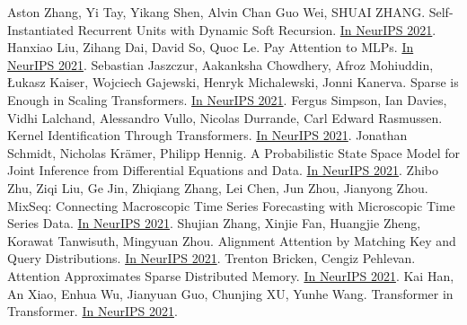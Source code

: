 \documentclass[b5paper,xelatex,ja=standard,10pt]{bxjsarticle}
\begin{document}
\begin{thebibliography}{99}
     Aston Zhang, Yi Tay, Yikang Shen, Alvin Chan Guo Wei, SHUAI ZHANG. Self-Instantiated Recurrent Units with Dynamic Soft Recursion. {\href{https://proceedings.neurips.cc/paper/2021/hash/3341f6f048384ec73a7ba2e77d2db48b-Abstract.html}{In NeurIPS 2021}}.
     Hanxiao Liu, Zihang Dai, David So, Quoc Le. Pay Attention to MLPs. {\href{https://proceedings.neurips.cc/paper/2021/hash/4cc05b35c2f937c5bd9e7d41d3686fff-Abstract.html}{In NeurIPS 2021}}.
     Sebastian Jaszczur, Aakanksha Chowdhery, Afroz Mohiuddin, Łukasz Kaiser, Wojciech Gajewski, Henryk Michalewski, Jonni Kanerva. Sparse is Enough in Scaling Transformers. {\href{https://proceedings.neurips.cc/paper/2021/hash/51f15efdd170e6043fa02a74882f0470-Abstract.html}{In NeurIPS 2021}}.
     Fergus Simpson, Ian Davies, Vidhi Lalchand, Alessandro Vullo, Nicolas Durrande, Carl Edward Rasmussen. Kernel Identification Through Transformers. {\href{https://proceedings.neurips.cc/paper/2021/hash/56c3b2c6ea3a83aaeeff35eeb45d700d-Abstract.html}{In NeurIPS 2021}}.
     Jonathan Schmidt, Nicholas Krämer, Philipp Hennig. A Probabilistic State Space Model for Joint Inference from Differential Equations and Data. {\href{https://proceedings.neurips.cc/paper/2021/hash/6734fa703f6633ab896eecbdfad8953a-Abstract.html}{In NeurIPS 2021}}.
     Zhibo Zhu, Ziqi Liu, Ge Jin, Zhiqiang Zhang, Lei Chen, Jun Zhou, Jianyong Zhou. MixSeq: Connecting Macroscopic Time Series Forecasting with Microscopic Time Series Data. {\href{https://proceedings.neurips.cc/paper/2021/hash/6b5754d737784b51ec5075c0dc437bf0-Abstract.html}{In NeurIPS 2021}}.
     Shujian Zhang, Xinjie Fan, Huangjie Zheng, Korawat Tanwisuth, Mingyuan Zhou. Alignment Attention by Matching Key and Query Distributions. {\href{https://proceedings.neurips.cc/paper/2021/hash/6fd6b030c6afec018415662d0db43f9d-Abstract.html}{In NeurIPS 2021}}.
     Trenton Bricken, Cengiz Pehlevan. Attention Approximates Sparse Distributed Memory. {\href{https://proceedings.neurips.cc/paper/2021/hash/8171ac2c5544a5cb54ac0f38bf477af4-Abstract.html}{In NeurIPS 2021}}.
     Kai Han, An Xiao, Enhua Wu, Jianyuan Guo, Chunjing XU, Yunhe Wang. Transformer in Transformer. {\href{https://proceedings.neurips.cc/paper/2021/hash/854d9fca60b4bd07f9bb215d59ef5561-Abstract.html}{In NeurIPS 2021}}.

\end{thebibliography}
\end{document}
